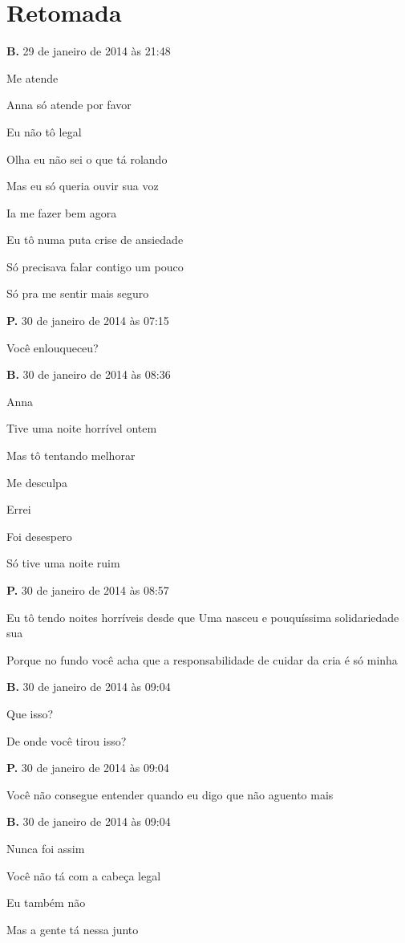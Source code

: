 \chapter{Retomada}

{\parindent0pt\parskip1pt\raggedright
\textbf{B.} 29 de janeiro de 2014 às 21:48

Me atende

Anna só atende por favor

Eu não tô legal

Olha eu não sei o que tá rolando

Mas eu só queria ouvir sua voz

Ia me fazer bem agora

Eu tô numa puta crise de ansiedade

Só precisava falar contigo um pouco

Só pra me sentir mais seguro

\textbf{P.} 30 de janeiro de 2014 às 07:15

Você enlouqueceu?

\textbf{B.} 30 de janeiro de 2014 às 08:36

Anna

Tive uma noite horrível ontem

Mas tô tentando melhorar

Me desculpa

Errei

Foi desespero

Só tive uma noite ruim

\textbf{P.} 30 de janeiro de 2014 às 08:57

Eu tô tendo noites horríveis desde que Uma nasceu e pouquíssima
solidariedade sua

Porque no fundo você acha que a responsabilidade de cuidar da cria é só
minha

\textbf{B.} 30 de janeiro de 2014 às 09:04

Que isso?

De onde você tirou isso?

\textbf{P.} 30 de janeiro de 2014 às 09:04

Você não consegue entender quando eu digo que não aguento mais

\textbf{B.} 30 de janeiro de 2014 às 09:04

Nunca foi assim

Você não tá com a cabeça legal

Eu também não

Mas a gente tá nessa junto

}

